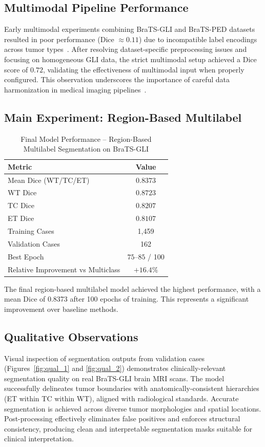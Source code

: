 \documentclass[conference]{IEEEtran}
\begin{document}
\subsection{Multimodal Pipeline Performance}

Early multimodal experiments combining BraTS-GLI and BraTS-PED datasets resulted in poor performance (Dice $\approx 0.11$) due to incompatible label encodings across tumor types~\cite{11}. After resolving dataset-specific preprocessing issues and focusing on homogeneous GLI data, the strict multimodal setup achieved a Dice score of $0.72$, validating the effectiveness of multimodal input when properly configured. This observation underscores the importance of careful data harmonization in medical imaging pipelines~\cite{5,6}.

\subsection{Main Experiment: Region-Based Multilabel}

\begin{table}[htbp]
\centering
\caption{Final Model Performance -- Region-Based Multilabel Segmentation on BraTS-GLI}
\small
\begin{tabular}{|p{3.5cm}|c|}
\hline
\textbf{Metric} & \textbf{Value} \\
\hline
Mean Dice (WT/TC/ET) & $0.8373$ \\
WT Dice & $0.8723$ \\
TC Dice & $0.8207$ \\
ET Dice & $0.8107$ \\
Training Cases & 1,459 \\
Validation Cases & 162 \\
Best Epoch & $75$--$85$ / 100 \\
Relative Improvement vs Multiclass & $+16.4\%$ \\
\hline
\end{tabular}
\normalsize
\end{table}

The final region-based multilabel model achieved the highest performance, with a mean Dice of 0.8373 after 100 epochs of training. This represents a significant improvement over baseline methods.

\subsection{Qualitative Observations}

Visual inspection of segmentation outputs from validation cases (Figures~\ref{fig:qual_1} and \ref{fig:qual_2}) demonstrates clinically-relevant segmentation quality on real BraTS-GLI brain MRI scans. The model successfully delineates tumor boundaries with anatomically-consistent hierarchies (ET within TC within WT), aligned with radiological standards. Accurate segmentation is achieved across diverse tumor morphologies and spatial locations. Post-processing effectively eliminates false positives and enforces structural consistency, producing clean and interpretable segmentation masks suitable for clinical interpretation.
\end{document}
